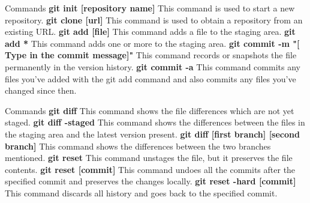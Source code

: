 \documentclass[xcolor=x11names,compress]{beamer}
\renewcommand{\(}{\begin{columns}}
\renewcommand{\)}{\end{columns}}
\newcommand{\<}[1]{\begin{column}{#1}}
\renewcommand{\>}{\end{column}}
\begin{document}
\begin{frame}{Commands}
\textbf{git init [repository name]		}	\newline	This command is used to start a new repository.	\newline	\newline
\textbf{git clone [url]		}	\newline	This command is used to obtain a repository from an existing URL.\newline	\newline
\textbf{ git add [file]}\newline
This command adds a file to the staging area.\newline	\newline
\textbf{git add *		}	\newline	This command adds one or more to the staging area.\newline\newline
\textbf{git commit -m "[ Type in the commit message]"}	\newline	This command records or snapshots the file permanently in the version history.	\newline	\newline
\textbf{git commit -a}	\newline
This command commits any files you've added with the git add command and also commits any files you've changed since then.\newline \newline

\end{frame}
\begin{frame}{Commands}
\textbf{git diff}	\newline	This command shows the file differences which are not yet staged.	\newline	\newline
\textbf{git diff -staged}	\newline	This command shows the differences between the files in the staging area and the latest version present.	\newline	\newline
\textbf{git diff [first branch] [second branch]		}	\newline	This command shows the differences between the two branches mentioned.	\newline	\newline
\textbf{git reset}	\newline	This command unstages the file, but it preserves the file contents.	\newline	\newline
\textbf{git reset [commit]		}	\newline	This command undoes all the commits after the specified commit and preserves the changes locally.	\newline	\newline
\textbf{git reset -hard [commit]}	\newline	This command discards all history and goes back to the specified commit.	\newline	\newline

\end{frame}
\end{document}
